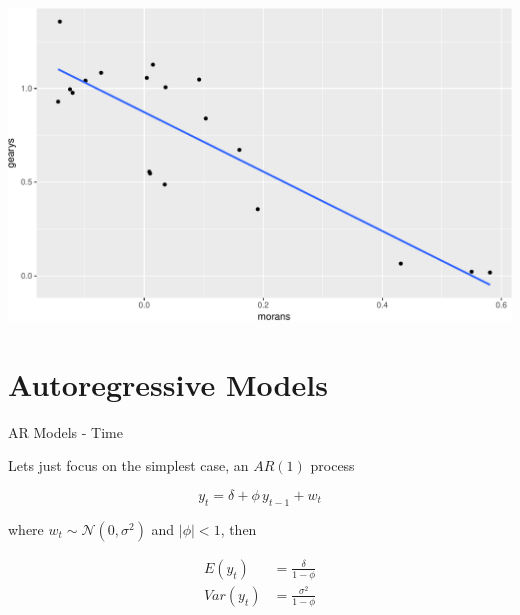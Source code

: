 \documentclass[11pt,ignorenonframetext,]{beamer}
\begin{document}
\begin{frame}{}

\includegraphics{Lec18_files/figure-beamer/unnamed-chunk-6-1.pdf}

\end{frame}

\section{Autoregressive Models}\label{autoregressive-models}

\begin{frame}[t]{AR Models - Time}

Lets just focus on the simplest case, an \(AR(1)\) process

\[ y_t = \delta + \phi \, y_{t-1} + w_t \]

where \(w_t \sim \mathcal{N}(0,\sigma^2)\) and \(|\phi| < 1\), then

\[
\begin{aligned}
E(y_t) &= \frac{\delta}{1-\phi} \\
Var(y_t) &= \frac{\sigma^2}{1-\phi}
\end{aligned}
\]

\end{frame}
\end{document}
